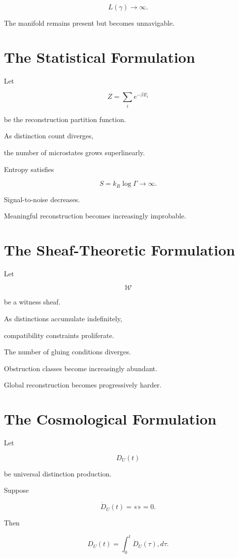 \documentclass[12pt,oneside]{book}
\theoremstyle{plain} \newtheorem{theorem}{Theorem}[chapter] \newtheorem{lemma}[theorem]{Lemma} \newtheorem{proposition}[theorem]{Proposition} \newtheorem{corollary}[theorem]{Corollary}
\theoremstyle{definition} \newtheorem{definition}[theorem]{Definition} \newtheorem{axiom}[theorem]{Axiom} \newtheorem{construction}[theorem]{Construction}
\theoremstyle{remark} \newtheorem{remark}[theorem]{Remark} \newtheorem{example}[theorem]{Example}
\begin{document}
\[
L(\gamma)
\rightarrow
\infty.
\]

The manifold remains present but becomes unnavigable.

\section{The Statistical Formulation}

Let

\[
Z
=
\sum_i
e^{-\beta E_i}
\]

be the reconstruction partition function.

As distinction count diverges,

the number of microstates grows superlinearly.

Entropy satisfies

\[
S
=
k_R\log\Gamma
\rightarrow
\infty.
\]

Signal-to-noise decreases.

Meaningful reconstruction becomes increasingly improbable.

\section{The Sheaf-Theoretic Formulation}

Let

\[
\mathcal W
\]

be a witness sheaf.

As distinctions accumulate indefinitely,

compatibility constraints proliferate.

The number of gluing conditions diverges.

Obstruction classes become increasingly abundant.

Global reconstruction becomes progressively harder.

\section{The Cosmological Formulation}

Let

\[
D_U(t)
\]

be universal distinction production.

Suppose

\[
\dot D_U(t)
=
«»
=
0. 

\]

Then

\[
D_U(t)
=
\int_0^t
\dot D_U(\tau)
,d\tau.
\]
\end{document}
